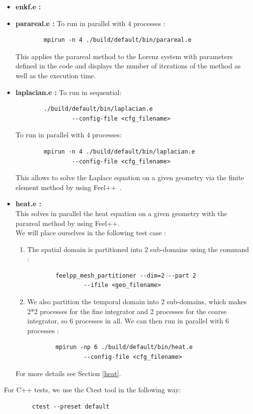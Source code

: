\begin{enumerate}[label=\textbullet]
		\begin{itemize}[label=-]
			\item \textbf{enkf.e : } 
			\item \textbf{parareal.e : } To run in parallel with 4 processes :
\begin{lstlisting}
		mpirun -n 4 ./build/default/bin/parareal.e
\end{lstlisting}
			This applies the parareal method to the Lorenz system with parameters defined in the code and displays the number of iterations of the method as well as the execution time. 
			\item \textbf{laplacian.e : } To run in sequential:
\begin{lstlisting}
		./build/default/bin/laplacian.e 
				--config-file <cfg_filename>
\end{lstlisting}
			To run in parallel with 4 processes:
\begin{lstlisting}
		mpirun -n 4 ./build/default/bin/laplacian.e 
				--config-file <cfg_filename>
\end{lstlisting}
			This allows to solve the Laplace equation on a given geometry via the finite element method by using Feel++~\cite{feelpp_laplacian}.
			\item \textbf{heat.e : } \\
			This solves in parallel the heat equation on a given geometry with the parareal method by using Feel++. \\
			We will place ourselves in the following test case :
			\begin{enumerate}[label=\ding{213}]
				\item The spatial domain is partitioned into 2 sub-domains using the command :
\begin{lstlisting}
		feelpp_mesh_partitioner --dim=2 --part 2 
				--ifile <geo_filename> 
\end{lstlisting}
			\item We also partition the temporal domain into 2 sub-domains, which makes 2*2 processes for the fine integrator and 2 processes for the coarse integrator, so 6 processes in all. We can then run in parallel with 6 processes :
\begin{lstlisting}
		mpirun -np 6 ./build/default/bin/heat.e 
				--config-file <cfg_filename>
\end{lstlisting}		
		\end{enumerate}
		For more details see Section \ref{heat}.
		\end{itemize}
		For C++ tests, we use the Ctest tool in the following way:
\begin{lstlisting}
		ctest --preset default
\end{lstlisting}
	\end{enumerate}

